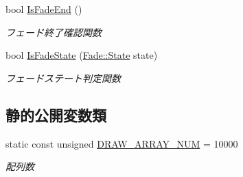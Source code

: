 \begin{DoxyCompactItemize}
bool \mbox{\hyperlink{class_draw_manager_afc50e8dbf21ffdf6d7a076e0027cae09}{Is\+Fade\+End}} ()
\begin{DoxyCompactList}\small\item\em フェード終了確認関数 \end{DoxyCompactList}\item 
bool \mbox{\hyperlink{class_draw_manager_a4852a5a809e2e067d38e994f0d1650fc}{Is\+Fade\+State}} (\mbox{\hyperlink{class_fade_ae77826bf3ff2ab95fb7b3b6f95cba80a}{Fade\+::\+State}} state)
\begin{DoxyCompactList}\small\item\em フェードステート判定関数 \end{DoxyCompactList}\end{DoxyCompactItemize}
\subsection*{静的公開変数類}
\begin{DoxyCompactItemize}
\item 
static const unsigned \mbox{\hyperlink{class_draw_manager_ad4326cddcb1cc4cec198c4f8069b81f0}{D\+R\+A\+W\+\_\+\+A\+R\+R\+A\+Y\+\_\+\+N\+UM}} = 10000
\begin{DoxyCompactList}\small\item\em 配列数 \end{DoxyCompactList}\end{DoxyCompactItemize}
